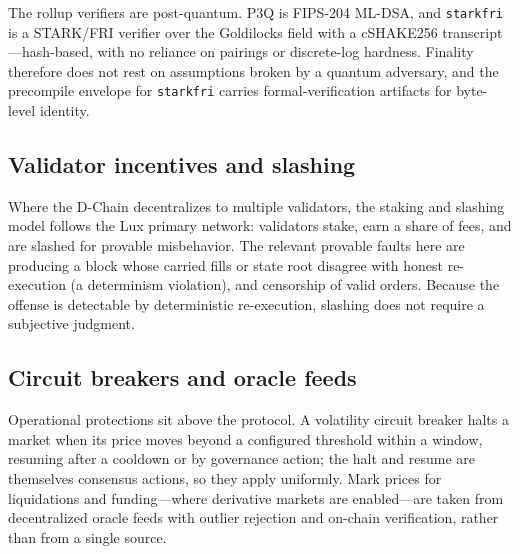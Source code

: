 The rollup verifiers are post-quantum. P3Q is FIPS-204 ML-DSA, and \texttt{starkfri} is a
STARK/FRI verifier over the Goldilocks field with a cSHAKE256 transcript---hash-based, with
no reliance on pairings or discrete-log hardness. Finality therefore does not rest on
assumptions broken by a quantum adversary, and the precompile envelope for \texttt{starkfri}
carries formal-verification artifacts for byte-level identity.

\subsection{Validator incentives and slashing}

Where the D-Chain decentralizes to multiple validators, the staking and slashing model
follows the Lux primary network: validators stake, earn a share of fees, and are slashed for
provable misbehavior. The relevant provable faults here are producing a block whose carried
fills or state root disagree with honest re-execution (a determinism violation), and
censorship of valid orders. Because the offense is detectable by deterministic
re-execution, slashing does not require a subjective judgment.

\subsection{Circuit breakers and oracle feeds}

Operational protections sit above the protocol. A volatility circuit breaker halts a market
when its price moves beyond a configured threshold within a window, resuming after a cooldown
or by governance action; the halt and resume are themselves consensus actions, so they apply
uniformly. Mark prices for liquidations and funding---where derivative markets are
enabled---are taken from decentralized oracle feeds with outlier rejection and on-chain
verification, rather than from a single source.
